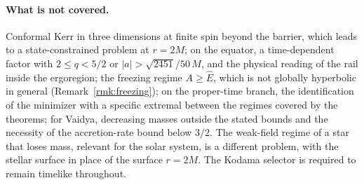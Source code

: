 \documentclass[aip,jmp,amsmath,amssymb,reprint]{revtex4-2}
\newcommand{\Ehat}{\hat E}
\theoremstyle{plain}
\theoremstyle{definition}
\begin{document}
\paragraph{What is not covered.} Conformal Kerr in three dimensions at finite spin beyond the barrier,
which leads to a state-constrained problem at $r=2M$; on the equator, a time-dependent factor with
$2\le q<5/2$ or $|a|>\sqrt{2451}/50\,M$, and the physical reading of the rail inside the ergoregion; the
freezing regime $A\ge\Ehat$, which is not globally hyperbolic in general (Remark~\ref{rmk:freezing});
on the proper-time branch, the identification of the minimizer with a specific extremal between the
regimes covered by the theorems; for Vaidya, decreasing masses outside the stated bounds and the
necessity of the accretion-rate bound below $3/2$. The weak-field regime of a star that loses mass,
relevant for the solar system, is a different problem, with the stellar surface in place of
the surface $r=2M$. The Kodama selector is required to remain timelike throughout.
\end{document}
